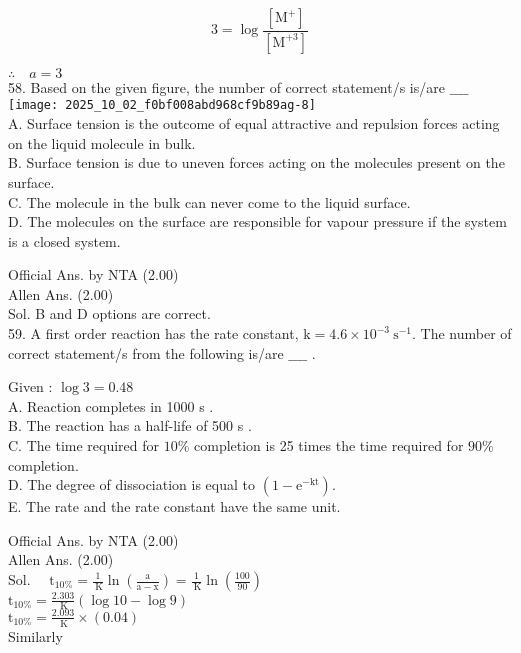 \documentclass[10pt]{article}
\begin{document}
\[
3=\log \frac{\left[\mathrm{M}^{+}\right]}{\left[\mathrm{M}^{+3}\right]}
\]

\(\therefore \quad a=3\)\\
58. Based on the given figure, the number of correct statement/s is/are \(\_\_\_\_\)\\
\texttt{[image: 2025\_10\_02\_f0bf008abd968cf9b89ag-8]}\\
A. Surface tension is the outcome of equal attractive and repulsion forces acting on the liquid molecule in bulk.\\
B. Surface tension is due to uneven forces acting on the molecules present on the surface.\\
C. The molecule in the bulk can never come to the liquid surface.\\
D. The molecules on the surface are responsible for vapour pressure if the system is a closed system.

Official Ans. by NTA (2.00)\\
Allen Ans. (2.00)\\
Sol. B and D options are correct.\\
59. A first order reaction has the rate constant, \(\mathrm{k}=4.6 \times 10^{-3} \mathrm{~s}^{-1}\). The number of correct statement/s from the following is/are \(\_\_\_\_\) .

Given : \(\log 3=0.48\)\\
A. Reaction completes in 1000 s .\\
B. The reaction has a half-life of 500 s .\\
C. The time required for \(10 \%\) completion is 25 times the time required for \(90 \%\) completion.\\
D. The degree of dissociation is equal to \(\left(1-\mathrm{e}^{-\mathrm{kt}}\right)\).\\
E. The rate and the rate constant have the same unit.

Official Ans. by NTA (2.00)\\
Allen Ans. (2.00)\\
Sol. \(\quad \mathrm{t}_{10 \%}=\frac{1}{\mathrm{~K}} \ln \left(\frac{\mathrm{a}}{\mathrm{a}-\mathrm{x}}\right)=\frac{1}{\mathrm{~K}} \ln \left(\frac{100}{90}\right)\)\\
\(\mathrm{t}_{10 \%}=\frac{2.303}{\mathrm{~K}}(\log 10-\log 9)\)\\
\(\mathrm{t}_{10 \%}=\frac{2.093}{\mathrm{~K}} \times(0.04)\)\\
Similarly
\end{document}
